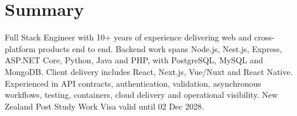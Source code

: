 \documentclass[10pt, letterpaper]{article}
\begin{document}
    \newcommand{\AND}{\unskip\cleaders\copy\ANDbox\hskip\wd\ANDbox\ignorespaces}
    \newsavebox\ANDbox
    \sbox\ANDbox{$|$}


    \vspace{5 pt - 0.3 cm}

    \section{Summary}
        \begin{onecolentry}
            Full Stack Engineer with 10+ years of experience delivering web and cross-platform products end to end. Backend work spans Node.js, Nest.js, Express, ASP.NET Core, Python, Java and PHP, with PostgreSQL, MySQL and MongoDB. Client delivery includes React, Next.js, Vue/Nuxt and React Native. Experienced in API contracts, authentication, validation, asynchronous workflows, testing, containers, cloud delivery and operational visibility. New Zealand Post Study Work Visa valid until 02 Dec 2028.
        \end{onecolentry}
\end{document}
